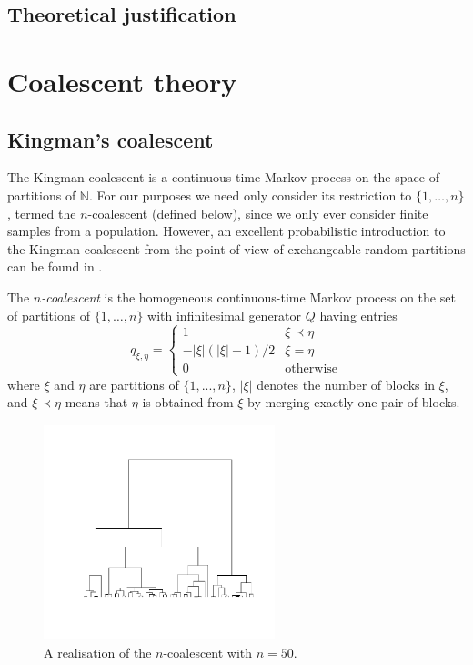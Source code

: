 \subsection{Theoretical justification}


\section{Coalescent theory}

\subsection{Kingman's coalescent}
The Kingman coalescent \parencite{kingman1982gene, kingman1982coal, kingman1982exch} is a continuous-time Markov process on the space of partitions of $\mathbb{N}$. For our purposes we need only consider its restriction to $\{1,\dots,n\}$, termed the $n$-coalescent (defined below), since we only ever consider finite samples from a population. 
However, an excellent probabilistic introduction to the Kingman coalescent from the point-of-view of exchangeable random partitions can be found in \textcite[Chapters 1--2]{berestycki2009}. 
\begin{defn}
\label{def:kingman}
The \emph{$n$-coalescent} is the homogeneous continuous-time Markov process on the set of partitions of $\{1,\dots,n\}$ with infinitesimal generator $Q$ having entries
\begin{equation}\label{eq:KCgenerator}
q_{\xi,\eta} = \begin{cases}
1 & \xi \prec \eta\\
-|\xi|(|\xi|-1)/2 & \xi=\eta \\
0 & \text{otherwise}
\end{cases}
\end{equation}
where $\xi$ and $\eta$ are partitions of $\{1,...,n\}$, $|\xi|$ denotes the number of blocks in $\xi$, and $\xi \prec \eta$ means that $\eta$ is obtained from $\xi$ by merging exactly one pair of blocks.
\end{defn}

\begin{figure}
\centering
\includegraphics[width=0.6\textwidth, trim={2.8cm 3cm 1.5cm 2cm}, clip]{plots/ncoalescent.pdf}
\caption[The $n$-coalescent]{A realisation of the $n$-coalescent with $n=50$.}
\end{figure}

